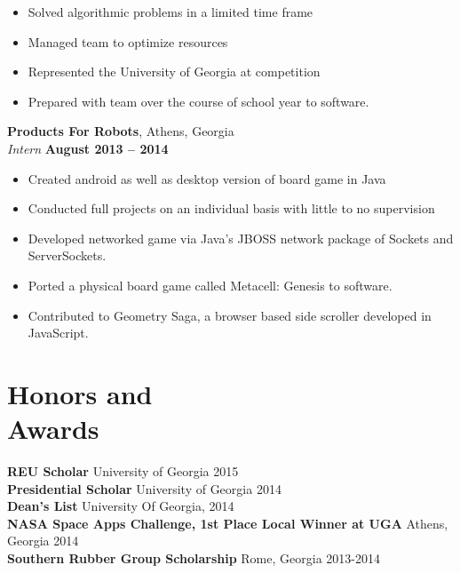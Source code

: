 \documentclass[margin,line]{resume}
\begin{document}
\begin{resume}
\begin{itemize}
   	\item Solved algorithmic problems in a limited time frame
   	\item Managed team to optimize resources
   	\item Represented the University of Georgia at competition
   	\item Prepared with team over the course of school year
   	to software.
   \end{itemize}
    \textbf{Products For Robots}, Athens, Georgia \vspace{1mm}\\\vspace{1mm}%
    \textsl{Intern} \hfill \textbf{August 2013 -- 2014}
\begin{itemize}
\item Created android as well as desktop version of board game in Java
\item Conducted full projects on an individual basis with little to no supervision
\item Developed networked game via Java's JBOSS network package of Sockets and ServerSockets.
\item Ported a physical board game called
Metacell: Genesis
to software.
\item Contributed to Geometry Saga, a browser based side scroller developed in JavaScript.
\end{itemize}
   \section{\mysidestyle Honors and\\Awards} 
   \textbf{REU Scholar} \hfill University of Georgia 2015\\
   \textbf{Presidential Scholar} \hfill University of Georgia 2014\\
   \textbf{Dean's List} \hfill University Of Georgia, 2014\\
   \textbf{NASA Space Apps Challenge, 1st Place Local Winner at UGA} \hfill Athens, Georgia 2014\\%
   \textbf{Southern Rubber Group Scholarship} \hfill Rome, Georgia 2013-2014
                




\end{resume}
\end{document}
